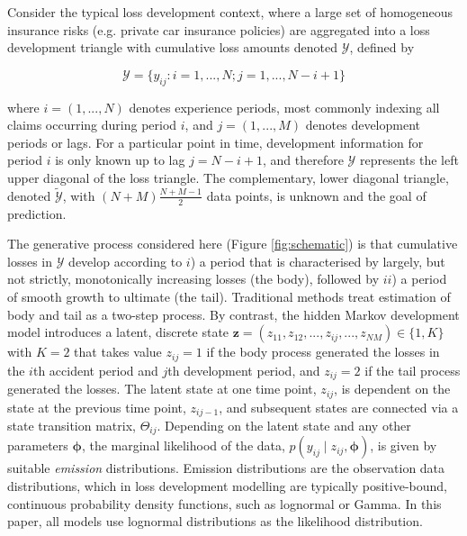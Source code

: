 Consider the typical loss development context, where
a large set of homogeneous insurance risks (e.g. private
car insurance policies) are aggregated
into a loss development triangle with
cumulative loss amounts denoted
$\mathcal{Y}$, defined by

\begin{equation}
	\mathcal{Y} = \{y_{ij} : i = 1, ..., N; j = 1, ..., N - i + 1\}
\end{equation}

where $i = (1, ..., N)$ denotes experience periods, most commonly
indexing all claims occurring during period $i$, and $j = (1, ..., M)$
denotes development periods or lags. For a particular point in time,
development information for period $i$ is only known up to lag 
$j = N - i + 1$,
and therefore $\mathcal{Y}$ represents the left upper diagonal of
the loss triangle. The complementary, lower diagonal 
triangle, denoted $\tilde{\mathcal{Y}}$, with $(N + M) \frac{N + M - 1}{2}$
data points, is unknown and the goal of prediction.

The generative process considered here (Figure \ref{fig:schematic})
is that cumulative losses
in $\mathcal{Y}$ develop according to $i$) a period that is
characterised by largely, but not strictly, monotonically 
increasing losses 
(the body), followed by $ii$) a period of smooth
growth to ultimate (the tail). Traditional methods
treat estimation of body and tail as a two-step process.
By contrast, the hidden Markov development model introduces a
latent, discrete state $\bm{z} = (z_{11}, z_{12}, ..., z_{ij}, ..., z_{NM})
\in \{1, K\}$ with $K = 2$ that takes value
$z_{ij} = 1$ if the body process generated the losses in the $i$th
accident period and $j$th development period, and
$z_{ij} = 2$ if the tail process generated the losses.
The latent state at one time point, $z_{ij}$, is dependent
on the state at the previous time point, $z_{ij-1}$,
and subsequent states are connected via a state transition
matrix, $\Theta_{ij}$.
Depending on the latent state and any other parameters
$\bm{\phi}$, the marginal likelihood 
of the data, $p(y_{ij} \mid z_{ij}, \bm{\phi})$,
is given by suitable \textit{emission} distributions.
Emission distributions are the observation data distributions,
which in loss development modelling are typically
positive-bound, continuous probability density
functions, such as lognormal or Gamma.
In this paper, all models use lognormal distributions
as the likelihood distribution.

